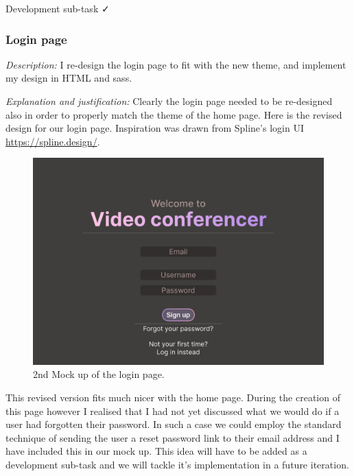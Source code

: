 {\color{gray} \hrulefill} \vspace{0.2cm}

{\sffamily Development sub-task  \faCheck}

\subsubsection{Login page}

\textit{Description:} I re-design the login page to fit with the
new theme, and implement my design in HTML and sass.\\ \vspace{0.2cm}

\textit{Explanation and justification:}
Clearly the login page needed to be re-designed also in order
to properly match the theme of the home page. Here is the 
revised design for our login page. Inspiration was drawn 
from Spline's login UI \url{https://spline.design/}.

\begin{figure}[H]
\centering

\includegraphics[scale=0.2]{Images/Login_Page_2.png}

\caption{2nd Mock up of the login page.}
\end{figure}

This revised version fits much nicer with the home page.
During the creation of this page however I realised that I 
had not yet discussed what we would do if a user had
forgotten their password. In such a case we could employ 
the standard technique of sending the user a reset password 
link to their email address and I have included this in 
our mock up. This idea will have to be added as a development
sub-task and we will tackle it's implementation in a future 
iteration. \\ \vspace{0.2cm}

